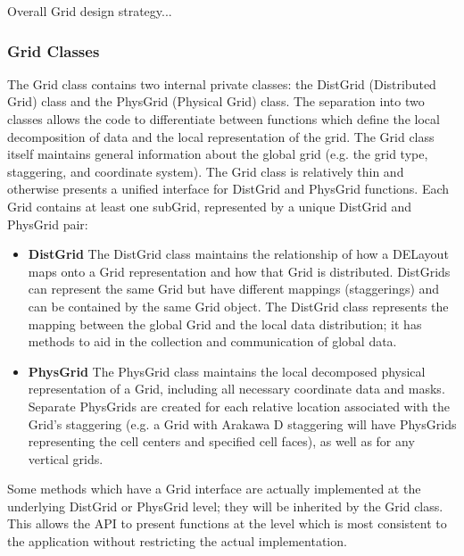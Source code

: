 


Overall Grid design strategy...

\subsubsection{Grid Classes}
The Grid class contains two internal private classes: the DistGrid (Distributed
Grid) class and the PhysGrid (Physical Grid) class.  The separation into two
classes allows the code to differentiate between functions which define the
local decomposition of data and the local representation of the grid.  The Grid
class itself maintains general information about the global grid (e.g. the
grid type, staggering, and coordinate system).  The Grid class is relatively
thin and otherwise presents a unified interface for DistGrid and PhysGrid
functions.  Each Grid contains at least one subGrid, represented by a unique
DistGrid and PhysGrid pair:
\begin{itemize}
\item {\bf DistGrid} The DistGrid class maintains the relationship of how
a DELayout maps onto a Grid representation and how that Grid is distributed.
DistGrids can represent the same Grid but have different mappings (staggerings)
and can be contained by the same Grid object. The DistGrid class represents the
mapping between the global Grid and the local data distribution;  it has
methods to aid in the collection and communication of global data.
\item {\bf PhysGrid} The PhysGrid class maintains the local decomposed physical
representation of a Grid, including all necessary coordinate data and masks.
Separate PhysGrids are created for each relative location associated with the
Grid's staggering (e.g. a Grid with Arakawa D staggering will have PhysGrids
representing the cell centers and specified cell faces), as well as for any
vertical grids.
\end{itemize}

Some methods which have a Grid interface are actually implemented
at the underlying DistGrid or PhysGrid level; they will be inherited
by the Grid class.  This allows the API to present functions at the 
level which is most consistent to the application without restricting
the actual implementation.

